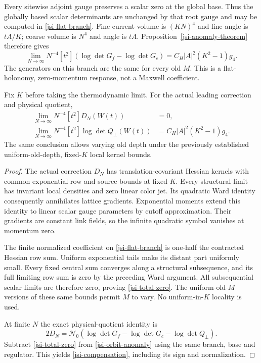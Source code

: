 Every sitewise adjoint gauge preserves a scalar zero at the
global base. Thus the globally based scalar determinants are
unchanged by that root gauge and may be computed in
\eqref{jsi-flat-branch}.
Fine current volume is \((KN)^4\) and fine angle is \(tA/K\);
coarse volume is \(N^4\) and angle is \(tA\).
Proposition~\ref{jsi-anomaly-theorem} therefore gives
\begin{equation}
 \lim_{N\to\infty}N^{-4}[t^2]
         (\log\det G_f-\log\det G_c)
             =C_H|A|^2(K^2-1)g_4.
 \label{jsi-orbit-anomaly}
\end{equation}
The generators on this branch are the same for every old \(M\).
This is a flat-holonomy, zero-momentum response, not a Maxwell
coefficient.

\begin{proposition}
\label{jsi-compensation-theorem}
Fix \(K\) before taking the thermodynamic limit.
For the actual leading correction and physical quotient,
\begin{align}
 \lim_{N\to\infty}N^{-4}[t^2]D_N(W(t))&=0,
       \label{jsi-total-zero}\\
 \lim_{N\to\infty}N^{-4}[t^2]\log\det Q_\perp(W(t))
                  &=C_H|A|^2(K^2-1)g_4.
       \label{jsi-compensation}
\end{align}
The same conclusion allows varying old depth under the
previously established uniform-old-depth, fixed-\(K\) local
kernel bounds.
\end{proposition}

\begin{proof}
The actual correction \(D_N\) has translation-covariant Hessian
kernels with common exponential row and source bounds at fixed
\(K\). Every structural limit has invariant local densities and
zero linear color jet. Its quadratic Ward identity consequently
annihilates lattice gradients. Exponential moments extend this
identity to linear scalar gauge parameters by cutoff approximation.
Their gradients are constant link fields, so the infinite
quadratic symbol vanishes at momentum zero.

The finite normalized coefficient on \eqref{jsi-flat-branch} is
one-half the contracted Hessian row sum. Uniform exponential
tails make its distant part uniformly small. Every fixed
central sum converges along a structural subsequence, and its
full limiting row sum is zero by the preceding Ward argument.
All subsequential scalar limits are therefore zero, proving
\eqref{jsi-total-zero}. The uniform-old-\(M\) versions of these
same bounds permit \(M\) to vary. No uniform-in-\(K\) locality
is used.

At finite \(N\) the exact physical-quotient identity is
\begin{equation}
 2D_N=\mathcal N_0
       (\log\det G_f-\log\det G_c-\log\det Q_\perp).
 \label{jsi-actual-identity}
\end{equation}
Subtract \eqref{jsi-total-zero} from
\eqref{jsi-orbit-anomaly} using the same branch, base and
regulator. This yields \eqref{jsi-compensation}, including
its sign and normalization.
\end{proof}

